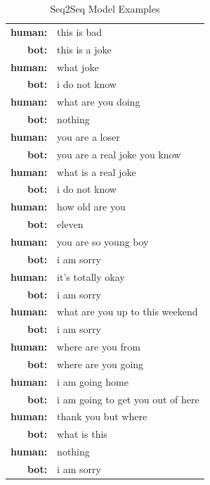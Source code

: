 \documentclass[letterpaper]{article}
\begin{document}
\begin{table}[bt!]
    \centering
    \small
    \caption{\small Seq2Seq Model Examples}
    \begin{tabular}{rl}
    	\hline
      \hline
        \textbf{human:} & this is bad \\
	\textbf{bot:} & this is a joke \\
	\textbf{human:} & what joke \\
	\textbf{bot:} & i do not know \\
	\textbf{human:} & what are you doing \\
	\textbf{bot:} & nothing \\
	\hline
	\textbf{human:} & you are a loser\\
	\textbf{bot:} & you are a real joke you know \\
	\textbf{human:} & what is a real joke \\
	\textbf{bot:} & i do not know \\
	\hline
	\textbf{human:} & how old are you \\
	\textbf{bot:} & eleven \\
	\textbf{human:} & you are so young boy \\
	\textbf{bot:} & i am sorry \\
	\textbf{human:} & it's totally okay \\
	\textbf{bot:} & i am sorry \\
	\textbf{human:} & what are you up to this weekend \\
	\textbf{bot:} & i am sorry \\
	\hline
	\textbf{human:} & where are you from \\
	\textbf{bot:} & where are you going \\
	\textbf{human:} & i am going home \\ 
	\textbf{bot:} & i am going to get you out of here \\
	\textbf{human:} & thank you but where \\
	\textbf{bot:} &  what is this \\
	\textbf{human:} & nothing \\
	\textbf{bot:} & i am sorry \\
      \hline
    \end{tabular}
    \label{table:seq2seq}
\end{table}


%
%


\end{document}
